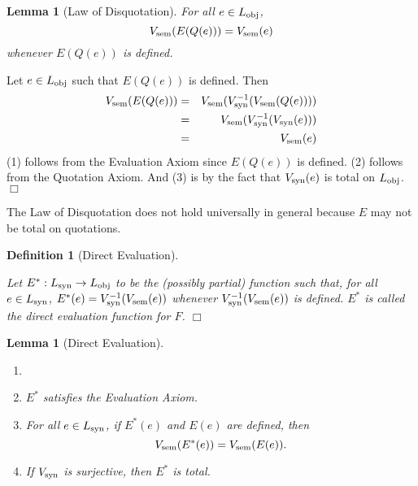 \documentclass[11pt,fleqn]{article}
\newcommand{\be}{\begin{enumerate}}
\newcommand{\ee}{\end{enumerate}}
\newcommand{\bsp}{\begin{sloppypar}}
\newcommand{\esp}{\end{sloppypar}}
\newcommand{\dblsp}{\ \ }
\newcommand{\tarrow}{\rightarrow}
\newtheorem{lem}[thm]{Lemma}
\newtheorem{df}[thm]{Definition}
\newenvironment{proof}{\par\noindent{\bf Proof\dblsp}}{\hfill$\Box$}
\begin{document}
\begin{lem}[Law of Disquotation] \label{lem:disquotation}
For all $e \in L_{\rm obj}$, \[V_{\rm sem}(E(Q(e))) = V_{\rm sem}(e)\]
whenever $E(Q(e))$ is defined.
\end{lem}

\begin{proof}
Let $e \in L_{\rm obj}$ such that $E(Q(e))$ is defined.  Then
\setcounter{equation}{0}
\begin{eqnarray}
V_{\rm sem}(E(Q(e))) & = & V_{\rm sem}(V_{\rm syn}^{-1}(V_{\rm sem}(Q(e)))) \\
                    & = & V_{\rm sem}(V_{\rm syn}^{-1}(V_{\rm syn}(e))) \\
                    & = & V_{\rm sem}(e)
\end{eqnarray}
(1) follows from the Evaluation Axiom since $E(Q(e))$ is defined. (2)
follows from the Quotation Axiom.  And (3) is by the fact that $V_{\rm
  syn}(e)$ is total on $L_{\rm obj}$.
\end{proof}

\bigskip

The Law of Disquotation does not hold universally in general because
$E$ may not be total on quotations.

\begin{df}[Direct Evaluation] \label{df:direct-eval} \em \bsp
Let $E^{\ast} : L_{\rm syn} \tarrow L_{\rm obj}$ to be the (possibly
partial) function such that, for all $e \in L_{\rm syn}$, $E^{\ast}(e)
= V_{\rm syn}^{-1}(V_{\rm sem}(e))$ whenever $V_{\rm syn}^{-1}(V_{\rm
  sem}(e))$ is defined.  $E^{\ast}$ is called the \emph{direct
  evaluation function for $F$}. \hfill $\Box$ \esp
\end{df}

\begin{lem}[Direct Evaluation] \label{lem:direct-eval}
\be

  \item[]

  \item $E^{\ast}$ satisfies the Evaluation Axiom.

  \item For all $e \in L_{\rm syn}$, if $E^{\ast}(e)$ and $E(e)$ are
    defined, then \[V_{\rm sem}(E^{\ast}(e)) = V_{\rm sem}(E(e)).\]

  \item If $V_{\rm syn}$ is surjective, then $E^{\ast}$ is total.

\ee
\end{lem}
\end{document}
